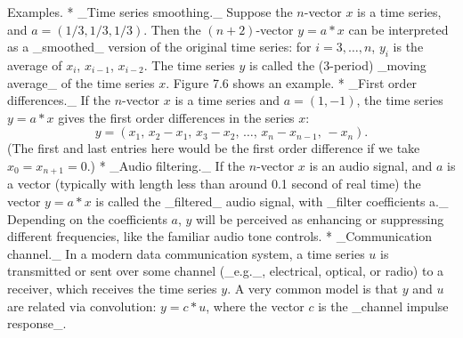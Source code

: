 Examples.
* _Time series smoothing._ Suppose the \(n\)-vector \(x\) is a time series, and \(a=(1/3,1/3,1/3)\). Then the \((n+2)\)-vector \(y=a*x\) can be interpreted as a _smoothed_ version of the original time series: for \(i=3,\ldots,n\), \(y_{i}\) is the average of \(x_{i}\), \(x_{i-1}\), \(x_{i-2}\). The time series \(y\) is called the (3-period) _moving average_ of the time series \(x\). Figure 7.6 shows an example.
* _First order differences._ If the \(n\)-vector \(x\) is a time series and \(a=(1,-1)\), the time series \(y=a*x\) gives the first order differences in the series \(x\): \[y=(x_{1},\,x_{2}-x_{1},\,x_{3}-x_{2},\,\ldots,\,x_{n}-x_{n-1},\,-x_{n}).\] (The first and last entries here would be the first order difference if we take \(x_{0}=x_{n+1}=0\).)
* _Audio filtering._ If the \(n\)-vector \(x\) is an audio signal, and \(a\) is a vector (typically with length less than around 0.1 second of real time) the vector \(y=a*x\) is called the _filtered_ audio signal, with _filter coefficients a._ Depending on the coefficients \(a\), \(y\) will be perceived as enhancing or suppressing different frequencies, like the familiar audio tone controls.
* _Communication channel._ In a modern data communication system, a time series \(u\) is transmitted or sent over some channel (_e.g._, electrical, optical, or radio) to a receiver, which receives the time series \(y\). A very common model is that \(y\) and \(u\) are related via convolution: \(y=c*u\), where the vector \(c\) is the _channel impulse response_.

 